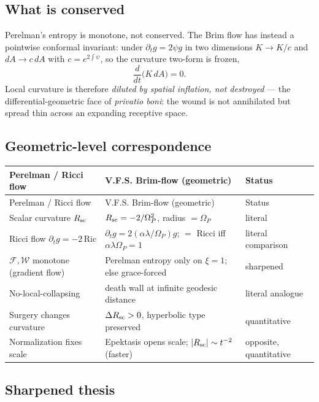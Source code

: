 \documentclass[11pt]{article}
\newcommand{\Om}{\Omega_P}
\begin{document}
\subsection{What is conserved}

Perelman's entropy is monotone, not conserved. The Brim flow has instead a pointwise conformal invariant: under $\partial_t g=2\psi g$ in two dimensions $K\to K/c$ and $dA\to c\,dA$ with $c=e^{2\int\psi}$, so the curvature two-form is frozen,
\begin{equation}
\frac{d}{dt}\big(K\,dA\big)=0.
\end{equation}
Local curvature is therefore \emph{diluted by spatial inflation, not destroyed} --- the differential-geometric face of \emph{privatio boni}: the wound is not annihilated but spread thin across an expanding receptive space.

\subsection{Geometric-level correspondence}

\begin{longtable}{>{\raggedright\arraybackslash}p{} >{\raggedright\arraybackslash}p{} >{\raggedright\arraybackslash}p{}}
\toprule
Perelman / Ricci flow & V.F.S. Brim-flow (geometric) & Status \\
\midrule
\endfirsthead
\toprule
Perelman / Ricci flow & V.F.S. Brim-flow (geometric) & Status \\
\midrule
\endhead
Scalar curvature $R_{\rm sc}$ & $R_{\rm sc}=-2/\Om^{2}$, radius $=\Om$ & literal \\
Ricci flow $\partial_t g=-2\,\mathrm{Ric}$ & $\partial_t g=2(\alpha\lambda/\Om)g$; $=$ Ricci iff $\alpha\lambda\Om=1$ & literal comparison \\
$\mathcal F,\mathcal W$ monotone (gradient flow) & Perelman entropy only on $\xi=1$; else grace-forced & sharpened \\
No-local-collapsing & death wall at infinite geodesic distance & literal analogue \\
Surgery changes curvature & $\Delta R_{\rm sc}>0$, hyperbolic type preserved & quantitative \\
Normalization fixes scale & Epektasis opens scale; $|R_{\rm sc}|\sim t^{-2}$ (faster) & opposite, quantitative \\
\bottomrule
\end{longtable}

\subsection{Sharpened thesis}
\end{document}
